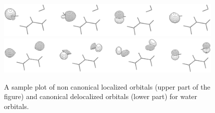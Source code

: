 \begin{center}
\begin{figure}[ht]
\begin{center}
\includegraphics[width=11cm]{03_nevpt/images/h2o-loc.eps}
\includegraphics[width=11cm]{03_nevpt/images/h2o-deloc.eps}
\end{center}
\caption{\footnotesize A sample plot of non canonical localized orbitals
(upper part of the figure) and canonical delocalized orbitals (lower part)
for water orbitals. }
\label{fig:h2o-orb}
\end{figure}
\end{center}
